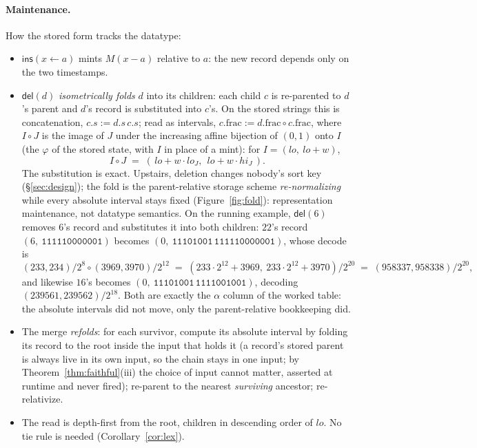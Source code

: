 \documentclass[11pt]{article}
\newcommand{\del}{\mathsf{del}}
\newcommand{\ins}{\mathsf{ins}}
\newcommand{\code}[1]{\texttt{#1}}
\begin{document}
\paragraph{Maintenance.} How the stored form tracks the datatype:
\begin{itemize}
\item $\ins(x \leftarrow a)$ mints $M(x - a)$ relative to $a$: the
new record depends only on the two timestamps.
\item $\del(d)$ \emph{isometrically folds} $d$ into its children:
each child $c$ is re-parented to $d$'s parent and $d$'s record is
substituted into $c$'s. On the stored strings this is concatenation,
$c.s := d.s\, c.s$; read as intervals, $c.\mathrm{frac} :=
d.\mathrm{frac} \circ c.\mathrm{frac}$, where $I \circ J$ is the
image of $J$ under the increasing affine bijection of $(0,1)$ onto
$I$ (the $\varphi$ of the stored state, with $I$ in place of a
mint): for $I = (lo,\ lo + w)$,
\[
  I \circ J \;=\; (\,lo + w \cdot lo_J,\ \ lo + w \cdot hi_J\,).
\]
The substitution is exact. Upstairs, deletion
changes nobody's sort key (\S\ref{sec:design}); the fold is the
parent-relative storage scheme \emph{re-normalizing} while every
absolute interval stays fixed (Figure~\ref{fig:fold}):
representation maintenance, not datatype semantics. On the running
example, $\del(6)$ removes $6$'s record and substitutes it into both
children: $22$'s record $(6,\ \code{111110000001})$ becomes
$(0,\ \code{11101001}\,\code{111110000001})$, whose decode is
\[
  (233, 234)/2^{8} \circ (3969, 3970)/2^{12}
  \;=\; (233 \cdot 2^{12} + 3969,\ 233 \cdot 2^{12} + 3970)/2^{20}
  \;=\; (958337, 958338)/2^{20},
\]
and likewise $16$'s becomes $(0,\
\code{11101001}\,\code{1111001001})$, decoding $(239561,
239562)/2^{18}$. Both are exactly the $\alpha$ column of the worked
table: the absolute intervals did not move, only the
parent-relative bookkeeping did.
\item The merge \emph{refolds}: for each survivor, compute its
absolute interval by folding its record to the root inside the input
that holds it (a record's stored parent is always live in its own
input, so the chain stays in one input; by
Theorem~\ref{thm:faithful}(iii) the choice of input cannot matter,
asserted at runtime and never fired); re-parent to the nearest
\emph{surviving} ancestor; re-relativize.
\item The read is depth-first from the root, children in descending
order of $lo$. No tie rule is needed (Corollary~\ref{cor:lex}).
\end{itemize}
\end{document}
